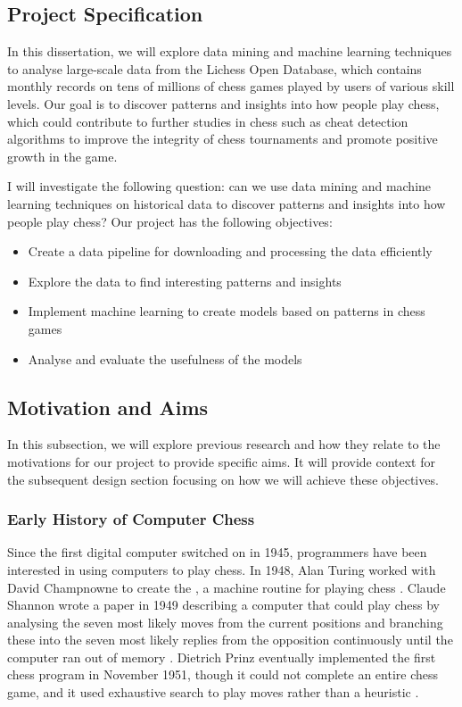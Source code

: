 \documentclass[a4paper, 11pt]{article}
\begin{document}
\subsection{Project Specification}
In this dissertation, we will explore data mining and machine learning techniques to analyse large-scale data from the Lichess Open Database, which contains monthly records on tens of millions of chess games played by users of various skill levels. Our goal is to discover patterns and insights into how people play chess, which could contribute to further studies in chess such as cheat detection algorithms to improve the integrity of chess tournaments and promote positive growth in the game.

I will investigate the following question: can we use data mining and machine learning techniques on historical data to discover patterns and insights into how people play chess? Our project has the following objectives:

\begin{itemize}
    \setlength\itemsep{-0.25em}
    \item Create a data pipeline for downloading and processing the data efficiently
    \item Explore the data to find interesting patterns and insights
    \item Implement machine learning to create models based on patterns in chess games
    \item Analyse and evaluate the usefulness of the models
\end{itemize}

\subsection{Motivation and Aims}
In this subsection, we will explore previous research and how they relate to the motivations for our project to provide specific aims. It will provide context for the subsequent design section focusing on how we will achieve these objectives.

\subsubsection{Early History of Computer Chess}
Since the first digital computer switched on in 1945, programmers have been interested in using computers to play chess. In 1948, Alan Turing worked with David Champnowne to create the , a machine routine for playing chess \cite{copeland2005turing}. Claude Shannon wrote a paper in 1949 describing a computer that could play chess by analysing the seven most likely moves from the current positions and branching these into the seven most likely replies from the opposition continuously until the computer ran out of memory \cite{shannon1950xxii}. Dietrich Prinz eventually implemented the first chess program in November 1951, though it could not complete an entire chess game, and it used exhaustive search to play moves rather than a heuristic \cite{copeland2005turing}.
\end{document}
